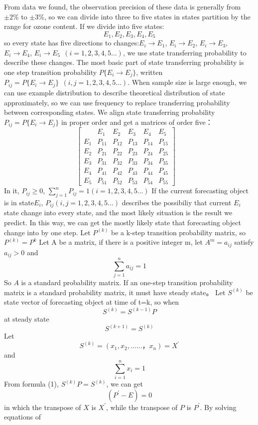 \documentclass[12pt]{article}
\begin{document}
From data we found, the observation precision of these data is generally from $±2\%$  to $ ±3\%$, so we can divide into three to five states in states partition by the range for ozone content. If we divide into five states:$$E_1, E_2, E_3, E_4, E_5$$ so every state has five directions to changes:$E_i \to E_1$, $E_i \to E_2$, $E_i \to E_3$, $E_i \to E_4$, $E_i \to E_5 \ \ (i=1,2,3,4,5\ldots)$, we use state transferring probability to describe these changes. The most basic part of state transferring probability is one step transition probability $P\{E_i\to E_j\}$,  written $P_{ij}=P\{E_i\to E_j\}\ \ (i, j=1,2,3,4,5\ldots)$.
When sample size is large enough, we can use example distribution to describe  theoretical distribution of state approximately, so we can use frequency to replace transferring probability between corresponding states. 
We align state transferring probability $P_{ij}=P\{E_i\to E_j\}$ in proper order and get a matrices of order five：
$$
\begin{bmatrix} &E_1&E_2&E_3&E_4&E_5\\E_1&P_{11}&P_{12}&P_{13}&P_{14}&P_{15}\\E_2&P_{21}&P_{22}&P_{23}&P_{24}&P_{25}\\E_3&P_{31}&P_{32}&P_{33}&P_{34}&P_{35}\\E_4&P_{41}&P_{42}&P_{43}&P_{44}&P_{45}\\E_5&P_{51}&P_{52}&P_{53}&P_{54}&P_{55} \end{bmatrix} \quad
$$
In it, $P_{ij} \geq 0$, $\sum_{j=1}^{n}P_{ij}=1 (i=1,2,3,4,5 \ldots)$
    If the current forecasting object is in state$ E_i$, $P_{ij} (i,j=1,2,3,4,5\ldots)$ describes the possibiliy that current $ E_i$ state change into every state, and the most likely situation is the result we predict. In this way, we can get the mostly likely state that forecasting object change into by one step.
Let $P^{(k)}$ be a k-step transition probability matrix, so $P^{(k)}=P^k$
Let A be a matrix, if there is a positive integer m, let $A^m=a_{ij}$ satisfy $a_{ij}>0$ and $$\sum_{j=1}^{n}a_{ij}=1$$ 
So $A$ is a standard probability matrix.
If an one-step transition probability matrix is a standard probability matrix, it must have steady state。
Let $S^{(k)}$ be state vector of forecasting object at time of t=k, so when $$S^{(k)}=S^{(k-1)}P$$ at steady state $$S^{(k+1)}=S^{(k)}$$
Let $$S^{(k)}=(x_1,x_2,……，x_n)=X^{'}$$ and $$\sum_{i=1}^{n}x_{i}=1$$
From formula (1), $S^{(k)}P=S^{(k)}$, we can get $$(P^{'}-E)=0$$ in which the transpose of $X$ is $X^{'}$, while the transpose of $P$ is $P^{'}$.
By solving equations of
\end{document}
